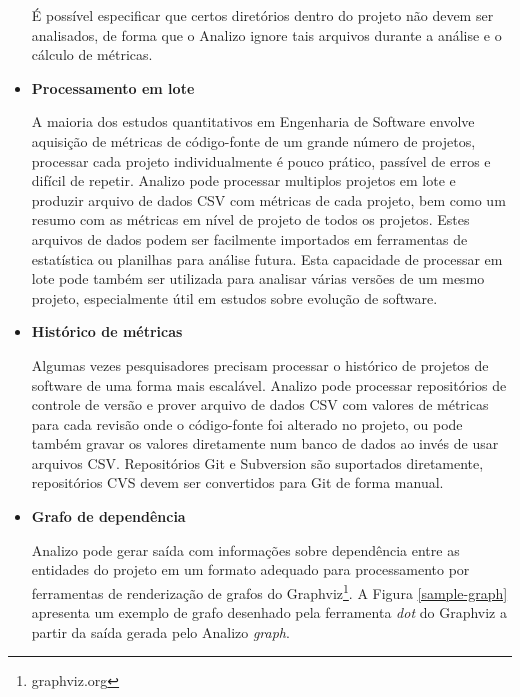 \begin{itemize}
\begin{itemize}
\end{itemize}

É possível especificar que certos diretórios dentro do projeto não devem ser
analisados, de forma que o Analizo ignore tais arquivos durante a análise e o
cálculo de métricas.

\item {\bf Processamento em lote}\label{lote}

A maioria dos estudos quantitativos em Engenharia de Software envolve aquisição
de métricas de código-fonte de um grande número de projetos, processar cada
projeto individualmente é pouco prático, passível de erros e difícil de
repetir. Analizo pode processar multiplos projetos em lote e produzir arquivo
de dados CSV com métricas de cada projeto, bem como um resumo com as métricas
em nível de projeto de todos os projetos. Estes arquivos de dados podem ser
facilmente importados em ferramentas de estatística ou planilhas para análise
futura. Esta capacidade de processar em lote pode também ser utilizada para
analisar várias versões de um mesmo projeto, especialmente útil em estudos
sobre evolução de software.


\item {\bf Histórico de métricas}

Algumas vezes pesquisadores precisam processar o histórico de projetos de
software de uma forma mais escalável. Analizo pode processar repositórios de
controle de versão e prover arquivo de dados CSV com valores de métricas para
cada revisão onde o código-fonte foi alterado no projeto, ou pode também gravar
os valores diretamente num banco de dados ao invés de usar arquivos CSV. Repositórios Git e
Subversion são suportados diretamente, repositórios CVS devem ser convertidos
para Git de forma manual.

\item {\bf Grafo de dependência}

Analizo pode gerar saída com informações sobre dependência entre as entidades
do projeto em um formato adequado para processamento por ferramentas de
renderização de grafos do Graphviz\footnote{graphviz.org}. A Figura
\ref{sample-graph} apresenta um exemplo de grafo desenhado pela ferramenta {\it
dot} do Graphviz a partir da saída gerada pelo Analizo {\it graph}.


\end{itemize}
